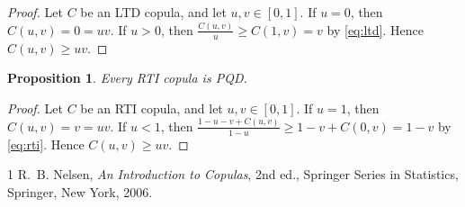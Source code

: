 \documentclass{article}
\newtheorem{proposition}{Proposition}
\begin{document}
\begin{proof}
Let $C$ be an LTD copula, and let $u,v\in[0,1]$.
If $u=0$, then $C(u,v)=0=uv$.
If $u>0$, then $\frac{C(u,v)}{u}\ge C(1,v)=v$ by \eqref{eq:ltd}.
Hence $C(u,v)\ge uv$.
\end{proof}

\begin{proposition}\label{prop:rti}
Every RTI copula is PQD.
\end{proposition}

\begin{proof}
Let $C$ be an RTI copula, and let $u,v\in[0,1]$.
If $u=1$, then $C(u,v)=v=uv$.
If $u<1$, then $\frac{1-u-v+C(u,v)}{1-u}\ge1-v+C(0,v)=1-v$ by \eqref{eq:rti}.
Hence $C(u,v)\ge uv$.
\end{proof}

\begin{thebibliography}{1}
 R.~B. Nelsen, \emph{An Introduction to Copulas}, 2nd ed., Springer Series in Statistics, Springer, New York, 2006.
\end{thebibliography}
\end{document}
